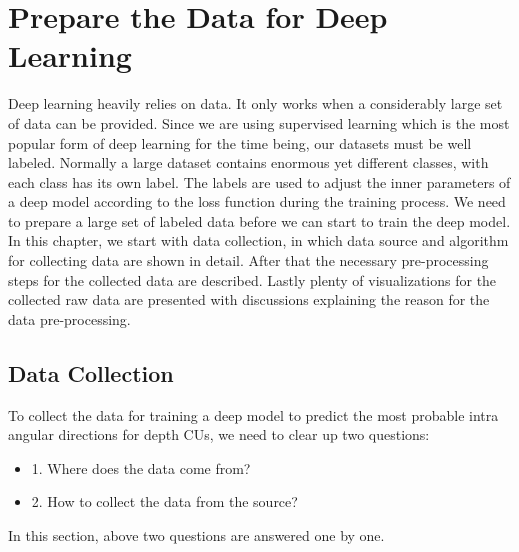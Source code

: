\chapter{Prepare the Data for Deep Learning}\label{ch:chapter3} %

Deep learning heavily relies
on data.
It only works when a considerably large set of data can be provided.
Since we are using supervised learning which is the most
popular form of deep learning for the time being, our datasets
must be well labeled.
Normally a large dataset contains enormous yet different classes,
with each class has its own label.
The labels are used to adjust the inner parameters of a
deep model according to the loss function during the training
process.
We need to prepare a large set of labeled data before 
we can start to train the deep model.
In this chapter, we start with data collection, in which data source
and algorithm for collecting data are shown in detail.
After that the necessary pre-processing steps for the collected 
data are described.
Lastly plenty of visualizations for the collected raw data 
are presented with
discussions explaining the reason for the data pre-processing.

\section{Data Collection}\label{sec:data-collection}
To collect the data for training a deep model to predict the most probable
intra angular directions for depth CUs, we need to clear up two questions:
\begin{itemize}
    \item 1. Where does the data come from?
    \item 2. How to collect the data from the source?
\end{itemize}
In this section, above two questions are answered one by one.

